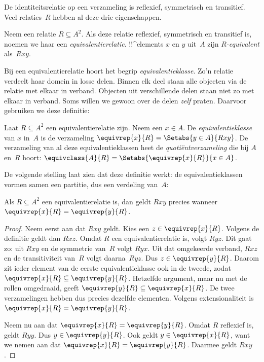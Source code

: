 \documentclass[openany]{memoir}
\begin{document}

De identiteitsrelatie op een verzameling is reflexief, symmetrisch en
transitief. Veel relaties~$R$ hebben al deze drie eigenschappen.

\begin{defn}[Equivalentierelatie] 
Neem een relatie $R \subseteq A^2$. Als deze relatie reflexief, symmetrisch en
transitief is, noemen we haar een \emph{equivalentierelatie}.
!!^{element}s $x$ en $y$ uit~$A$ zijn \emph{$R$-equivalent} als~$Rxy$.
\end{defn}

Bij een equivalentierelatie hoort het begrip \emph{equivalentieklasse}.
Zo'n relatie verdeelt haar domein in losse delen. Binnen elk deel staan
alle objecten via de relatie met elkaar in verband. Objecten uit
verschillende delen staan niet zo met elkaar in verband. Soms willen
we gewoon over de delen \emph{zelf} praten. Daarvoor gebruiken we deze
definitie:

\begin{defn}
Laat $R \subseteq A^2$ een equivalentierelatie zijn. Neem een $x \in A$.
De \emph{equivalentieklasse} van $x$ in~$A$ is de verzameling
$\equivrep{x}{R} = \Setabs{y \in A}{Rxy}$. De verzameling van al deze
equivalentieklassen heet de \emph{quotiëntverzameling} die bij $A$ en~$R$ hoort:
$\equivclass{A}{R} = \Setabs{\equivrep{x}{R}}{x \in A}$. 
\end{defn}

De volgende stelling laat zien dat deze definitie werkt: de
equivalentieklassen vormen samen een partitie, dus een verdeling van~$A$:

\begin{prop}
Als $R \subseteq A^2$ een equivalentierelatie is, dan geldt $Rxy$ precies wanneer
$\equivrep{x}{R} = \equivrep{y}{R}$.
\end{prop}

\begin{proof}
Neem eerst aan dat $Rxy$ geldt. Kies een $z \in \equivrep{x}{R}$.
Volgens de definitie geldt dan $Rxz$. Omdat $R$ een equivalentierelatie
is, volgt $Ryz$. Dit gaat zo: uit $Rxy$ en de symmetrie van~$R$ volgt
$Ryx$. Uit dat omgekeerde verband, $Rxz$ en de transitiviteit van~$R$
volgt daarna~$Ryz$.
Dus $z \in \equivrep{y}{R}$. Daarom zit ieder element van de eerste
equivalentieklasse ook in de tweede, zodat $\equivrep{x}{R} \subseteq
\equivrep{y}{R}$. Hetzelfde argument, maar nu met de rollen omgedraaid,
geeft $\equivrep{y}{R} \subseteq \equivrep{x}{R}$. De twee verzamelingen
hebben dus precies dezelfde elementen. Volgens extensionaliteit is
$\equivrep{x}{R} = \equivrep{y}{R}$.

Neem nu aan dat $\equivrep{x}{R} = \equivrep{y}{R}$. Omdat $R$
reflexief is, geldt $Ryy$. Dus $y \in \equivrep{y}{R}$. Ook geldt
$y \in \equivrep{x}{R}$, want we nemen aan dat $\equivrep{x}{R} =
\equivrep{y}{R}$. Daarmee geldt $Rxy$.
\end{proof}
\end{document}
